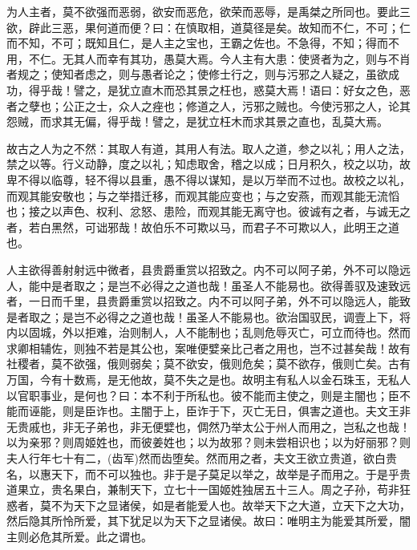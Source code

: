 \documentclass[]{article}
\begin{document}
为人主者，莫不欲强而恶弱，欲安而恶危，欲荣而恶辱，是禹桀之所同也。要此三欲，辟此三恶，果何道而便？曰：在慎取相，道莫径是矣。故知而不仁，不可；仁而不知，不可；既知且仁，是人主之宝也，王霸之佐也。不急得，不知；得而不用，不仁。无其人而幸有其功，愚莫大焉。今人主有大患：使贤者为之，则与不肖者规之；使知者虑之，则与愚者论之；使修士行之，则与污邪之人疑之，虽欲成功，得乎哉！譬之，是犹立直木而恐其景之枉也，惑莫大焉！语曰：好女之色，恶者之孽也；公正之士，众人之痤也；修道之人，污邪之贼也。今使污邪之人，论其怨贼，而求其无偏，得乎哉！譬之，是犹立枉木而求其景之直也，乱莫大焉。

故古之人为之不然：其取人有道，其用人有法。取人之道，参之以礼；用人之法，禁之以等。行义动静，度之以礼；知虑取舍，稽之以成；日月积久，校之以功，故卑不得以临尊，轻不得以县重，愚不得以谋知，是以万举而不过也。故校之以礼，而观其能安敬也；与之举措迁移，而观其能应变也；与之安燕，而观其能无流慆也；接之以声色、权利、忿怒、患险，而观其能无离守也。彼诚有之者，与诚无之者，若白黑然，可诎邪哉！故伯乐不可欺以马，而君子不可欺以人，此明王之道也。

人主欲得善射射远中微者，县贵爵重赏以招致之。内不可以阿子弟，外不可以隐远人，能中是者取之；是岂不必得之之道也哉！虽圣人不能易也。欲得善驭及速致远者，一日而千里，县贵爵重赏以招致之。内不可以阿子弟，外不可以隐远人，能致是者取之；是岂不必得之之道也哉！虽圣人不能易也。欲治国驭民，调壹上下，将内以固城，外以拒难，治则制人，人不能制也；乱则危辱灭亡，可立而待也。然而求卿相辅佐，则独不若是其公也，案唯便嬖亲比己者之用也，岂不过甚矣哉！故有社稷者，莫不欲强，俄则弱矣；莫不欲安，俄则危矣；莫不欲存，俄则亡矣。古有万国，今有十数焉，是无他故，莫不失之是也。故明主有私人以金石珠玉，无私人以官职事业，是何也？曰：本不利于所私也。彼不能而主使之，则是主闇也；臣不能而诬能，则是臣诈也。主闇于上，臣诈于下，灭亡无日，俱害之道也。夫文王非无贵戚也，非无子弟也，非无便嬖也，倜然乃举太公于州人而用之，岂私之也哉！以为亲邪？则周姬姓也，而彼姜姓也；以为故邪？则未尝相识也；以为好丽邪？则夫人行年七十有二，(齿军)然而齿堕矣。然而用之者，夫文王欲立贵道，欲白贵名，以惠天下，而不可以独也。非于是子莫足以举之，故举是子而用之。于是乎贵道果立，贵名果白，兼制天下，立七十一国姬姓独居五十三人。周之子孙，苟非狂惑者，莫不为天下之显诸侯，如是者能爱人也。故举天下之大道，立天下之大功，然后隐其所怜所爱，其下犹足以为天下之显诸侯。故曰：唯明主为能爱其所爱，闇主则必危其所爱。此之谓也。
\end{document}
